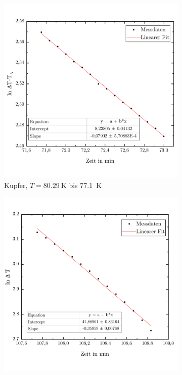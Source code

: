 \documentclass[parskip=half, a4paper,twoside,final]{article}
\begin{document}
\begin{figure}[ht!]
  \centering
  \begin{subfigure}[b!]{0.45\textwidth}
    \includegraphics[width=\textwidth]{Bilder/77_1_80_29__lnDeltaT_TA.pdf}
    \caption{Kupfer, $T=\SI{80,29}{\kelvin}$ bis \SI{77,1}{\kelvin}}
  \end{subfigure}
  \begin{subfigure}[b!]{0.45\textwidth}
    \includegraphics[width=\textwidth]{Bilder/28_98__37_19__lnDeltaT.pdf}

\end{subfigure}
\end{figure}
\end{document}
